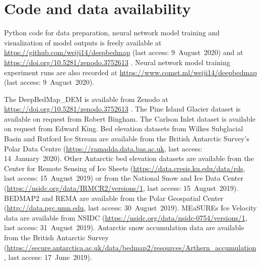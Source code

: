 
\section{Code and data availability}

Python code for data preparation, neural network model training and visualization of model outputs is freely available at \url{https://github.com/weiji14/deepbedmap} (last access: 9~August~2020) and at \url{https://doi.org/10.5281/zenodo.3752613} \citep{LeongDeepBedMap2020}.
Neural network model training experiment runs are also recorded at \url{https://www.comet.ml/weiji14/deepbedmap} (last access: 9~August~2020).

The DeepBedMap\_DEM is available from Zenodo at \url{https://doi.org/10.5281/zenodo.3752613}  \citep{LeongDeepBedMap2020}.
The Pine Island Glacier dataset \citep{BinghamDiverselandscapesPine2017} is available on request from Robert Bingham.
The Carlson Inlet dataset \citep{KingIcestreamnot2011} is available on request from Edward King.
Bed elevation datasets from Wilkes Subglacial Basin \citep{FerraccioliAirborneradarbed2018} and Rutford Ice Stream \citep{KingSubglaciallandformsRutford2016} are available from the British Antarctic Survey's Polar Data Centre (\url{https://ramadda.data.bas.ac.uk}, last access: 14~January~2020).
Other Antarctic bed elevation datasets are available from the Center for Remote Sensing of Ice Sheets (\url{https://data.cresis.ku.edu/data/rds}, last access: 15~August~2019) or from the National Snow and Ice Data Center (\url{https://nsidc.org/data/IRMCR2/versions/1}, last access: 15~August~2019).
BEDMAP2 \citep{FretwellBedmap2improvedice2013} and REMA \citep{HowatReferenceElevationModel2018} are available from the Polar Geospatial Center (\url{http://data.pgc.umn.edu}, last access: 30~August~2019).
MEaSUREs Ice Velocity data \citep{MouginotMEaSUREsPhaseMap2019} are available from NSIDC (\url{https://nsidc.org/data/nsidc-0754/versions/1}, last access: 31~August~2019).
Antarctic snow accumulation data \citep{ArthernAntarcticsnowaccumulation2006} are available from the British Antarctic Survey (\url{https://secure.antarctica.ac.uk/data/bedmap2/resources/Arthern_accumulation}, last access: 17~June~2019).


